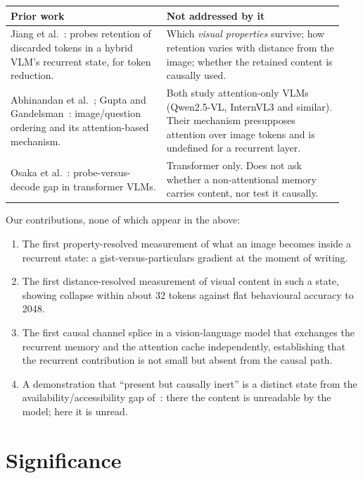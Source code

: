 \documentclass[11pt]{article}
\begin{document}
\begin{table}[h]
\centering\small
\begin{tabular}{@{}p{0.44\linewidth}p{0.5\linewidth}@{}}
\toprule
\textbf{Prior work} & \textbf{Not addressed by it} \\
\midrule
Jiang et al.~\cite{jiang2026stateful}: probes retention of discarded tokens in
a hybrid VLM's recurrent state, for token reduction.
& Which \emph{visual properties} survive; how retention varies with distance
from the image; whether the retained content is causally used. \\[4pt]
Abhinandan et al.~\cite{abhinandan2026asktwice}; Gupta and
Gandelsman~\cite{gupta2026modality}: image/question ordering and its
attention-based mechanism.
& Both study attention-only VLMs (Qwen2.5-VL, InternVL3 and similar). Their
mechanism presupposes attention over image tokens and is undefined for a
recurrent layer. \\[4pt]
Osaka et al.~\cite{osaka2026vab}: probe-versus-decode gap in transformer VLMs.
& Transformer only. Does not ask whether a non-attentional memory carries
content, nor test it causally. \\
\bottomrule
\end{tabular}
\end{table}

\noindent Our contributions, none of which appear in the above:
\begin{enumerate}\itemsep1pt
\item The first property-resolved measurement of what an image becomes inside a
recurrent state: a gist-versus-particulars gradient at the moment of writing.
\item The first distance-resolved measurement of visual content in such a
state, showing collapse within about 32 tokens against flat behavioural
accuracy to 2048.
\item The first causal channel splice in a vision-language model that
exchanges the recurrent memory and the attention cache independently,
establishing that the recurrent contribution is not small but absent from the
causal path.
\item A demonstration that ``present but causally inert'' is a distinct state
from the availability/accessibility gap of~\cite{osaka2026vab}: there the
content is unreadable by the model; here it is unread.
\end{enumerate}

\section{Significance}
\label{sec:significance}
\end{document}

